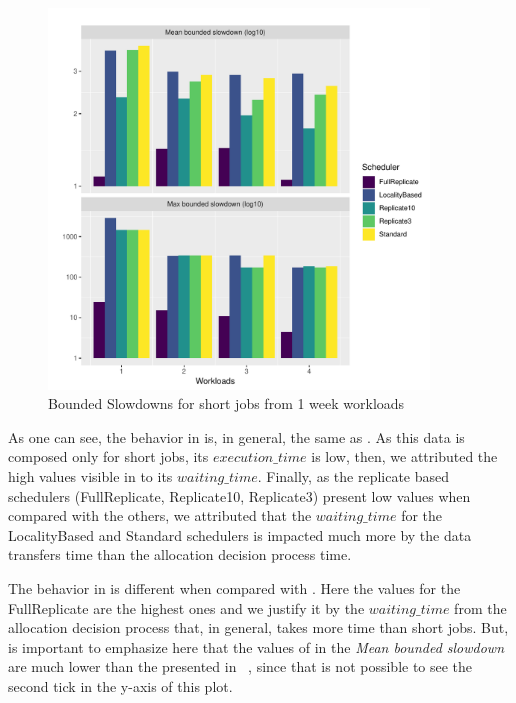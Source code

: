 \begin{figure}
    \centering
    \includegraphics[width=0.9\textwidth]{images/experiments/metrics/short_metrics_slowdown.pdf}
    \caption{Bounded Slowdowns for short jobs from 1 week workloads}
    \label{fig:short-bounded-slowdown}
\end{figure}



As one can see, the behavior in  is, in general, the same as .
As this data is composed only for short jobs, its $execution\_time$ is low, then, we attributed the high values visible in  to its $waiting\_time$. Finally, as the replicate based schedulers (FullReplicate, Replicate10, Replicate3) present low values when compared with the others, we attributed that the $waiting\_time$ for the LocalityBased and Standard schedulers is impacted much more by the data transfers time than the allocation decision process time.

The behavior in  is different when compared with . Here the values for the FullReplicate are the highest ones and we justify it by the $waiting\_time$ from the allocation decision process that, in general, takes more time than short jobs. But, is important to emphasize here that the values of  in the \textit{Mean bounded slowdown} are much lower than the presented in ~, since that is not possible to see the second tick in the y-axis of this plot.

